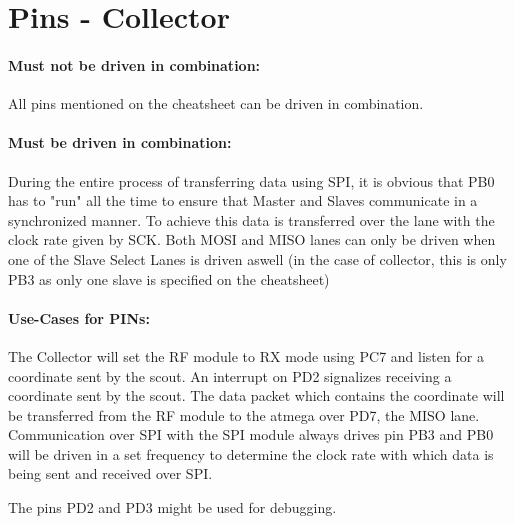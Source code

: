 \documentclass[12pt]{article}
\begin{document}
\vspace{1cm}

\newpage
\section*{Pins - Collector}


\paragraph{Must not be driven in combination:}
All pins mentioned on the cheatsheet can be driven in combination.

\paragraph{Must be driven in combination:}
During the entire process of transferring data using SPI, it is obvious that PB0 has to "run" all the time to ensure that Master and Slaves communicate in a  synchronized manner. To achieve this data is transferred over the lane with the clock rate given by SCK. Both MOSI and MISO lanes can only be driven when one of the Slave Select Lanes is driven aswell (in the case of collector, this is only PB3 as only one slave is specified on the cheatsheet)

\paragraph{Use-Cases for PINs:}

The Collector will set the RF module to RX mode using PC7 and listen for a coordinate sent by the scout. An interrupt on PD2 signalizes receiving a coordinate sent by the scout. The data packet which contains the coordinate will be transferred from the RF module to the atmega over PD7, the MISO lane. Communication over SPI with the SPI module always drives pin PB3 and PB0 will be driven in a set frequency to determine the clock rate with which data is being sent and received over SPI.

The pins PD2 and PD3 might be used for debugging.
\end{document}
